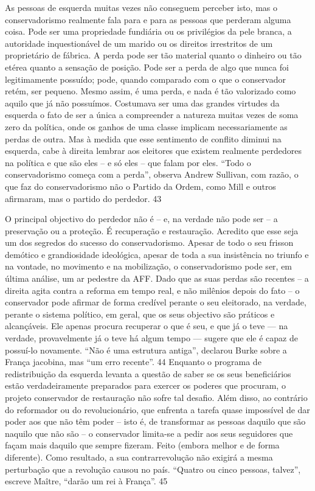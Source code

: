 As pessoas de esquerda muitas vezes não conseguem perceber isto, mas o conservadorismo realmente fala para e para as pessoas que perderam alguma coisa. Pode ser uma propriedade fundiária ou os privilégios da pele branca, a autoridade inquestionável de um marido ou os direitos irrestritos de um proprietário de fábrica. A perda pode ser tão material quanto o dinheiro ou tão etérea quanto a sensação de posição. Pode ser a perda de algo que nunca foi legitimamente possuído; pode, quando comparado com o que o conservador retém, ser pequeno. Mesmo assim, é uma perda, e nada é tão valorizado como aquilo que já não possuímos. Costumava ser uma das grandes virtudes da esquerda o fato de ser a única a compreender a natureza muitas vezes de soma zero da política, onde os ganhos de uma classe implicam necessariamente as perdas de outra. Mas à medida que esse sentimento de conflito diminui na esquerda, cabe à direita lembrar aos eleitores que existem realmente perdedores na política e que são eles – e só eles – que falam por eles. “Todo o conservadorismo começa com a perda”, observa Andrew Sullivan, com razão, o que faz do conservadorismo não o Partido da Ordem, como Mill e outros afirmaram, mas o partido do perdedor.
 {\color{blue} 43}  

 
\par
 
O principal objectivo do perdedor não é – e, na verdade não pode ser – a preservação ou a proteção. É recuperação e restauração. Acredito que esse seja um dos segredos do sucesso do conservadorismo. Apesar de todo o seu frisson demótico e grandiosidade ideológica, apesar de toda a sua insistência no triunfo e na vontade, no movimento e na mobilização, o conservadorismo pode ser, em última análise, um ar pedestre da AFF. Dado que as suas perdas são recentes – a direita agita contra a reforma em tempo real, e não milênios depois do fato – o conservador pode afirmar de forma credível perante o seu eleitorado, na verdade, perante o sistema político, em geral, que os seus objectivo são práticos e alcançáveis. Ele apenas procura recuperar o que é seu, e que já o teve — na verdade, provavelmente já o teve há algum tempo — sugere que ele é capaz de possuí-lo novamente. “Não é uma estrutura antiga”, declarou Burke sobre a França jacobina, mas “um erro recente”.
 {\color{blue} 44}  
Enquanto o programa de redistribuição da esquerda levanta a questão de saber se os seus beneficiários estão verdadeiramente preparados para exercer os poderes que procuram, o projeto conservador de restauração não sofre tal desafio. Além disso, ao contrário do reformador ou do revolucionário, que enfrenta a tarefa quase impossível de dar poder aos que não têm poder – isto é, de transformar as pessoas daquilo que são naquilo que não são – o conservador limita-se a pedir aos seus seguidores que façam mais daquilo que sempre fizeram. Feito (embora melhor e de forma diferente). Como resultado, a sua contrarrevolução não exigirá a mesma perturbação que a revolução causou no país. “Quatro ou cinco pessoas, talvez”, escreve Maître, “darão um rei à França”.
 {\color{blue} 45}  


